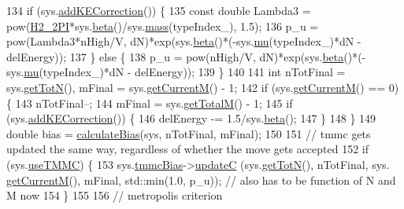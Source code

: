 \begin{DoxyCode}
134     \textcolor{keywordflow}{if} (sys.\hyperlink{classsim_system_a09c4ea670168c9f1d549d2a5120eb13c}{addKECorrection}()) \{
135         \textcolor{keyword}{const} \textcolor{keywordtype}{double} Lambda3 = pow(\hyperlink{global_8h_af42f520b793f7c9dff15cba3bad0eb58}{H2\_2PI}*sys.\hyperlink{classsim_system_a3eeec9678902f8d7fce4dad6064aaf4c}{beta}()/sys.\hyperlink{classsim_system_a7c75052458072e1267bc20594b58d8cd}{mass}(typeIndex\_), 1.5);
136         p\_u = pow(Lambda3*nHigh/V, dN)*exp(sys.\hyperlink{classsim_system_a3eeec9678902f8d7fce4dad6064aaf4c}{beta}()*(-sys.\hyperlink{classsim_system_af1e3f5320aff976a448647244d5950d1}{mu}(typeIndex\_)*dN - delEnergy));
137     \} \textcolor{keywordflow}{else} \{
138         p\_u = pow(nHigh/V, dN)*exp(sys.\hyperlink{classsim_system_a3eeec9678902f8d7fce4dad6064aaf4c}{beta}()*(-sys.\hyperlink{classsim_system_af1e3f5320aff976a448647244d5950d1}{mu}(typeIndex\_)*dN - delEnergy));
139     \}
140 
141         \textcolor{keywordtype}{int} nTotFinal = sys.\hyperlink{classsim_system_a37dd827f4057049763351510147b9f1d}{getTotN}(), mFinal = sys.\hyperlink{classsim_system_a299fe4372e610b554eaaf5f5957b2dbc}{getCurrentM}() - 1;
142         \textcolor{keywordflow}{if} (sys.\hyperlink{classsim_system_a299fe4372e610b554eaaf5f5957b2dbc}{getCurrentM}() == 0) \{
143             nTotFinal--;
144             mFinal = sys.\hyperlink{classsim_system_aa4ad1afff101bb530e1590df05035276}{getTotalM}() - 1;
145             \textcolor{keywordflow}{if} (sys.\hyperlink{classsim_system_a09c4ea670168c9f1d549d2a5120eb13c}{addKECorrection}()) \{
146                 delEnergy -= 1.5/sys.\hyperlink{classsim_system_a3eeec9678902f8d7fce4dad6064aaf4c}{beta}();
147             \}
148         \}
149         \textcolor{keywordtype}{double} bias = \hyperlink{system_8cpp_acfe185adf03db047fd3753c0d788e0e3}{calculateBias}(sys, nTotFinal, mFinal);
150 
151         \textcolor{comment}{// tmmc gets updated the same way, regardless of whether the move gets accepted}
152         \textcolor{keywordflow}{if} (sys.\hyperlink{classsim_system_aa474a50b6353c8897331b1ab1ce53ab1}{useTMMC}) \{
153             sys.\hyperlink{classsim_system_a13173f45a1e40a5f5a3552b0ebe15b54}{tmmcBias}->\hyperlink{classtmmc_ae067afc5b52af203b9d45f18d9737219}{updateC} (sys.\hyperlink{classsim_system_a37dd827f4057049763351510147b9f1d}{getTotN}(), nTotFinal, sys.
      \hyperlink{classsim_system_a299fe4372e610b554eaaf5f5957b2dbc}{getCurrentM}(), mFinal, std::min(1.0, p\_u)); \textcolor{comment}{// also has to be function of N and M now}
154         \}
155 
156     \textcolor{comment}{// metropolis criterion}

\end{DoxyCode}
